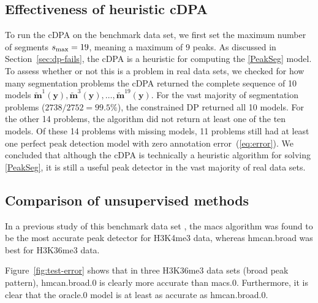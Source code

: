 \documentclass{article}
\begin{document}
\subsection{Effectiveness of heuristic cDPA}

To run the cDPA on the benchmark data set, we first set the maximum
number of segments $s_{\text{\text{max}}}=19$, meaning a maximum of $9$
peaks. 
As discussed in Section~\ref{sec:dp-fails}, the cDPA is a heuristic
for computing the \ref{PeakSeg} model. To assess whether or not this
is a problem in real data sets, we checked for how many segmentation
problems the cDPA returned the complete sequence of 10 models
$\mathbf{\tilde m}^1(\mathbf y),\mathbf{\tilde m}^3(\mathbf y), \dots,
\mathbf{\tilde m}^{19}(\mathbf y)$. For the vast majority of
segmentation problems ($2738/2752=99.5\%$), the constrained DP returned
all 10 models. For the other 14 problems, the algorithm did not return
at least one of the ten models. Of these 14 problems with missing
models, 11 problems still had at least one perfect peak detection
model with zero annotation error~(\ref{eq:error}). We concluded that
although the cDPA is technically a heuristic algorithm for
solving \ref{PeakSeg}, it is still a useful peak detector in the vast
majority of real data sets.



\subsection{Comparison of unsupervised methods}

In a previous study of this benchmark data set
\citep{hocking2014visual}, the macs algorithm was found to be the most
accurate peak detector for H3K4me3 data, whereas hmcan.broad was best
for H3K36me3 data.

Figure~\ref{fig:test-error} shows that in three H3K36me3 data sets
(broad peak pattern), hmcan.broad.0 is clearly more accurate than
macs.0. Furthermore, it is clear that the oracle.0 model is at least
as accurate as hmcan.broad.0.
\end{document}
